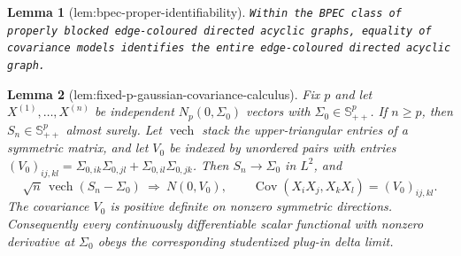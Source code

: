 \documentclass{article}
\newtheorem{lemma}{Lemma}
\begin{document}
\begin{lemma}[lem:bpec-proper-identifiability]\label{lem:bpec-proper-identifiability}
\texttt{Within the BPEC class of properly blocked edge-\allowbreak{}coloured directed acyclic graphs,\allowbreak{} equality of covariance models identifies the entire edge-\allowbreak{}coloured directed acyclic graph.}
\end{lemma}

\begin{lemma}[lem:fixed-p-gaussian-covariance-calculus]\label{lem:fixed-p-gaussian-covariance-calculus}
Fix \(p\) and let \(X^{(1)},\ldots,X^{(n)}\) be independent \(N_p(0,\Sigma_0)\) vectors with \(\Sigma_0\in\mathbb S^p_{++}\). If \(n\geq p\), then \(S_n\in\mathbb S^p_{++}\) almost surely. Let \(\operatorname{vech}\) stack the upper-triangular entries of a symmetric matrix, and let \(V_0\) be indexed by unordered pairs with entries \((V_0)_{ij,kl}=\Sigma_{0,ik}\Sigma_{0,jl}+\Sigma_{0,il}\Sigma_{0,jk}\). Then \(S_n\to\Sigma_0\) in \(L^2\), and
\[
 \sqrt n\,\operatorname{vech}(S_n-\Sigma_0)\ \Longrightarrow\ N(0,V_0),
 \qquad
 \operatorname{Cov}(X_iX_j,X_kX_l)=(V_0)_{ij,kl}.
\]
The covariance \(V_0\) is positive definite on nonzero symmetric directions. Consequently every continuously differentiable scalar functional with nonzero derivative at \(\Sigma_0\) obeys the corresponding studentized plug-in delta limit.
\end{lemma}
\end{document}
